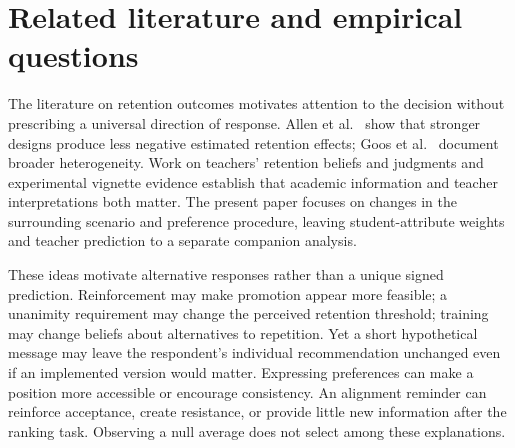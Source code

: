 \section{Related literature and empirical questions}
The literature on retention outcomes motivates attention to the decision without prescribing a universal direction of response. Allen et al.\ \cite{allen} show that stronger designs produce less negative estimated retention effects; Goos et al.\ \cite{goos} document broader heterogeneity. Work on teachers' retention beliefs and judgments \cite{tomchin,bonvin} and experimental vignette evidence \cite{klapproth} establish that academic information and teacher interpretations both matter. The present paper focuses on changes in the surrounding scenario and preference procedure, leaving student-attribute weights and teacher prediction to a separate companion analysis.

\cite{kunda,pajares,spillane}

These ideas motivate alternative responses rather than a unique signed prediction. Reinforcement may make promotion appear more feasible; a unanimity requirement may change the perceived retention threshold; training may change beliefs about alternatives to repetition. Yet a short hypothetical message may leave the respondent's individual recommendation unchanged even if an implemented version would matter. Expressing preferences can make a position more accessible or encourage consistency. An alignment reminder can reinforce acceptance, create resistance, or provide little new information after the ranking task. Observing a null average does not select among these explanations.


